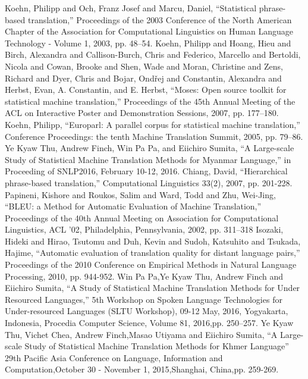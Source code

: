 \documentclass[conference]{IEEEtran}
\begin{document}
\begin{thebibliography}{00}

 Koehn, Philipp and Och, Franz Josef and Marcu, Daniel, ``Statistical phrase-based translation,'' Proceedings of the 2003 Conference of the North American Chapter of the Association for Computational Linguistics on Human Language Technology - Volume 1, 2003, pp. 48–54.
 Koehn, Philipp and Hoang, Hieu and Birch, Alexandra and Callison-Burch, Chris and Federico, Marcello and Bertoldi, Nicola and Cowan, Brooke and Shen, Wade and Moran, Christine and Zens, Richard and Dyer, Chris and Bojar, Ond\v{r}ej and Constantin, Alexandra and Herbst, Evan, A. Constantin, and E. Herbst, ``Moses: Open source toolkit for statistical machine translation,'' Proceedings of the 45th Annual Meeting of the ACL on Interactive Poster and Demonstration Sessions, 2007, pp. 177–180.
 Koehn, Philipp, ``Europarl: A parallel corpus for statistical machine translation,'' Conference Proceedings: the tenth Machine Translation Summit, 2005, pp. 79–86.
 Ye Kyaw Thu, Andrew Finch, Win Pa Pa, and Eiichiro Sumita, ``A Large-scale Study of Statistical Machine Translation Methods for Myanmar Language,'' in Proceeding of SNLP2016, February 10-12, 2016.
 Chiang, David,  ``Hierarchical phrase-based translation,'' Computational Linguistics 33(2),  2007, pp. 201-228.
 Papineni, Kishore and Roukos, Salim and Ward, Todd and Zhu, Wei-Jing, ``BLEU: a Method for Automatic Evaluation of Machine Translation,'' Proceedings of the 40th Annual Meeting on Association for Computational Linguistics, ACL '02, Philadelphia, Pennsylvania, 2002, pp. 311--318 
 Isozaki, Hideki and Hirao, Tsutomu  and Duh, Kevin  and Sudoh, Katsuhito and Tsukada, Hajime, ``Automatic evaluation of translation quality for distant language pairs,'' Proceedings of the 2010 Conference on Empirical Methods in Natural Language Processing, 2010, pp. 944-952.
 Win Pa Pa,Ye Kyaw Thu, Andrew Finch and Eiichiro Sumita, ``A Study of Statistical Machine Translation Methods for Under Resourced Languages,'' 5th Workshop on Spoken Language Technologies for Under-resourced Languages (SLTU Workshop), 09-12 May, 2016, Yogyakarta, Indonesia, Procedia Computer Science, Volume 81, 2016,pp. 250–257.
 Ye Kyaw Thu, Vichet Chea, Andrew Finch,Masao Utiyama and Eiichiro Sumita, ``A Large-scale Study of Statistical Machine Translation Methods for Khmer Language'' 29th Pacific Asia Conference on Language, Information and Computation,October 30 - November 1, 2015,Shanghai, China,pp. 259-269.

\end{thebibliography}
\end{document}
